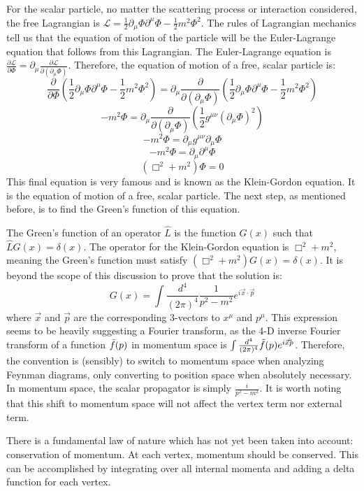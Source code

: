 \documentclass{report}
\begin{document}
For the scalar particle, no matter the scattering process or interaction considered, the free Lagrangian is $\mathcal{L} = \frac{1}{2}\partial_\mu \Phi \partial^\mu \Phi - \frac{1}{2}m^2 \Phi^2$. The rules of Lagrangian mechanics tell us that the equation of motion of the particle will be the Euler-Lagrange equation that follows from this Lagrangian. The Euler-Lagrange equation is $\frac{\partial \mathcal{L}}{\partial \Phi} = \partial_\mu \frac{\partial \mathcal{L}}{\partial (\partial_\mu \Phi)}$. Therefore, the equation of motion of a free, scalar particle is:
\[
\frac{\partial}{\partial \Phi} (\frac{1}{2}\partial_\mu \Phi \partial^\mu \Phi - \frac{1}{2}m^2 \Phi^2) = \partial_\mu \frac{\partial}{\partial (\partial_\mu \Phi)} (\frac{1}{2}\partial_\mu \Phi \partial^\mu \Phi - \frac{1}{2}m^2 \Phi^2)
\]
\[
-m^2 \Phi = \partial_\mu \frac{\partial}{\partial (\partial_\mu \Phi)} (\frac{1}{2}g^{\mu\nu}(\partial_\mu \Phi)^2)
\]
\[
-m^2 \Phi = \partial_\mu g^{\mu\nu} \partial_\mu \Phi
\]
\[
-m^2 \Phi = \partial_\mu \partial^\mu \Phi
\]
\[
(\Box^2 + m^2) \Phi = 0
\]
This final equation is very famous and is known as the Klein-Gordon equation. It is the equation of motion of a free, scalar particle. The next step, as mentioned before, is to find the Green's function of this equation.

The Green's function of an operator $\hat{L}$ is the function $G(x)$ such that $\hat{L}G(x) = \delta(x)$. The operator for the Klein-Gordon equation is $\Box^2 + m^2$, meaning the Green's function must satisfy $(\Box^2 + m^2) G(x) = \delta(x)$. It is beyond the scope of this discussion to prove that the solution is:
\[
G(x) = \int \frac{d^4}{(2\pi)^4} \frac{1}{p^2 - m^2} e^{i \vec{x} \cdot \vec{p}}
\]
where $\vec{x}$ and $\vec{p}$ are the corresponding 3-vectors to $x^\mu$ and $p^\mu$. This expression seems to be heavily suggesting a Fourier transform, as the 4-D inverse Fourier transform of a function $\Tilde{f}(p)$ in momentum space is $\int \frac{d^4}{(2\pi)^4} \Tilde{f}(p) e^{i \vec{x} \dot \vec{p}}$. Therefore, the convention is (sensibly) to switch to momentum space when analyzing Feynman diagrams, only converting to position space when absolutely necessary. In momentum space, the scalar propagator is simply $\frac{i}{p^2 - m^2}$. It is worth noting that this shift to momentum space will not affect the vertex term nor external term.

There is a fundamental law of nature which has not yet been taken into account: conservation of momentum. At each vertex, momentum should be conserved. This can be accomplished by integrating over all internal momenta and adding a delta function for each vertex.
\end{document}
